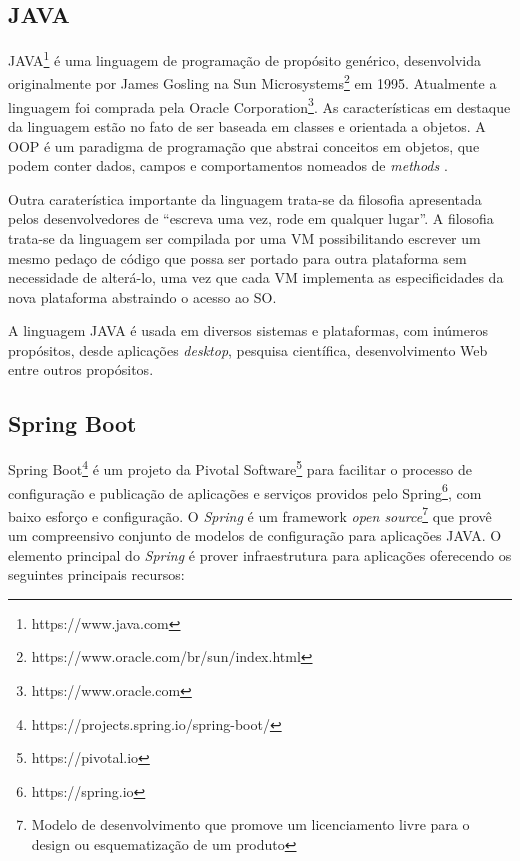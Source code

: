 \subsection{JAVA}

JAVA\footnote{https://www.java.com} é uma linguagem de programação de propósito genérico, desenvolvida originalmente por James Gosling na Sun Microsystems\footnote{ https://www.oracle.com/br/sun/index.html} em 1995. Atualmente a linguagem foi comprada pela Oracle Corporation\footnote{https://www.oracle.com}. As características em destaque da linguagem estão no fato de ser baseada em classes e orientada a objetos. A \ac{OOP} é um paradigma de programação que abstrai conceitos em objetos, que podem conter dados, campos e comportamentos nomeados de \textit{methods} \citep{Lewis2000}. 

Outra caraterística importante da linguagem trata-se da filosofia apresentada pelos desenvolvedores de “escreva uma vez, rode em qualquer lugar”. A filosofia trata-se da linguagem ser compilada por uma \ac{VM} possibilitando escrever um mesmo pedaço de código que possa ser portado para outra plataforma sem necessidade de alterá-lo, uma vez que cada \ac{VM} implementa as especificidades da nova plataforma abstraindo o acesso ao \ac{SO}.

A linguagem JAVA é usada em diversos sistemas e plataformas, com inúmeros propósitos, desde aplicações \textit{desktop}, pesquisa científica, desenvolvimento Web entre outros propósitos.

\subsection{Spring Boot}

Spring Boot\footnote{https://projects.spring.io/spring-boot/} é um projeto da 	Pivotal Software\footnote{https://pivotal.io} para facilitar o processo de configuração e publicação de aplicações e serviços providos pelo Spring\footnote{https://spring.io}, com baixo esforço e configuração. O \textit{Spring} é um framework \textit{open source}\footnote{Modelo de desenvolvimento que promove um licenciamento livre para o design ou esquematização  de um produto} que provê um compreensivo conjunto de modelos de configuração para aplicações JAVA. O elemento principal do \textit{Spring} é prover infraestrutura para aplicações oferecendo os seguintes principais recursos:

